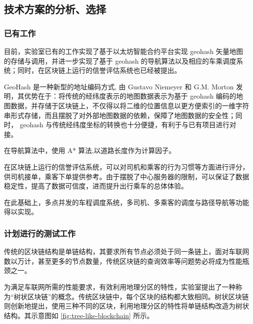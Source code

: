 \documentclass[type=undergraduate_proposal]{bitreport}
\begin{document}
\subsection{技术方案的分析、选择}


\subsubsection{已有工作}
目前，实验室已有的工作实现了基于以太坊智能合约平台实现 geohash 矢量地图的存储与调用，并进一步实现了基于 geohash 的导航算法以及相应的车乘调度系统；同时，在区块链上运行的信誉评估系统也已经被提出。

GeoHash 是一种新型的地址编码方式, 由 Gustavo Niemeyer 和 G.M. Morton 发明\cite{geohash_intro}，其优势在于：将传统的经纬度表示的地图数据表示为基于 geohash 编码的地图数据，并存储于区块链上，不仅得以将二维的位置信息以更方便索引的一维字符串形式存储，而且摆脱了对外部地图数据的依赖，保障了地图数据的安全性；同时， geohash 与传统经纬度坐标的转换也十分便捷\cite{7160068}，有利于与已有项目进行对接。

在导航算法中，使用 A* 算法\cite{a_star},以道路长度作为计算因子。

在区块链上运行的信誉评估系统，可以对司机和乘客的行为习惯等方面进行评分，供司机接单，乘客下单提供参考。由于摆脱了中心服务器的限制，可以保证了数据稳定性，提高了数据可信度，进而提升出行乘车的总体体验。

在此基础上，多点并发的车程调度系统，多司机、多乘客的调度与路径导航等功能得以实现。

\subsubsection{计划进行的测试工作}
传统的区块链结构是单链结构，其要求所有节点必须处于同一条链上，面对车联网数以万计，甚至更多的节点数量，传统区块链的查询效率等问题势必将成为性能瓶颈之一\cite{limits}。

为满足车联网所需的性能要求，有效利用地理分区的特性，实验室提出了一种称为“树状区块链”的概念\cite{sensors}。传统区块链中，每个区块的结构都大致相同。树状区块链则创新地提出，使用三种不同的区块，利用地理分区的特性将单链结构改造为树状结构。其示意图如 \ref{fig:tree-like-blockchain} 所示。
\end{document}
